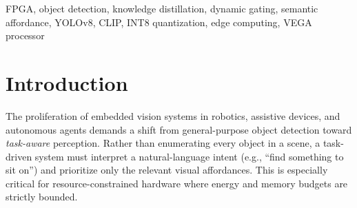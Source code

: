 \documentclass[conference]{IEEEtran}
\begin{document}
\begin{abstract}
Current object detection systems for edge devices are constrained by the computational
burden of cross-modal attention mechanisms, which carry a quadratic complexity of
$O(N^{2})$. These architectures produce large similarity matrices and rely on Softmax
functions that are incompatible with the fixed-point arithmetic of embedded processors
such as the VEGA RISC-V processor, creating critical memory bottlenecks. This paper
proposes a task-driven pipeline that replaces heavy cross-modal attention with a
lightweight dynamic gating mechanism operating at the channel level, reducing fusion
complexity to $O(N)$. A YOLOv8 visual backbone is distilled from a frozen CLIP teacher
model, transferring functional affordance reasoning into a compact 6\,MB student model
via Mean Squared Error minimization. A Task-Mapping Multi-Layer Perceptron (MLP)
generates Hadamard-product gating coefficients that selectively activate or suppress
feature channels based on semantic intent. Deployment on the Genesys-2 FPGA using
INT8 quantization and bit-shift arithmetic yields a 96.29\% average channel sparsity,
a 40.93\% improvement in semantic alignment over the YOLOv8 baseline, and a
77.04\% estimated dynamic power saving---all while maintaining 100\% detection
consistency with the dense baseline across 5,000 test images.
\end{abstract}

\begin{IEEEkeywords}
FPGA, object detection, knowledge distillation, dynamic gating, semantic affordance,
YOLOv8, CLIP, INT8 quantization, edge computing, VEGA processor
\end{IEEEkeywords}

\section{Introduction}

The proliferation of embedded vision systems in robotics, assistive devices, and
autonomous agents demands a shift from general-purpose object detection toward
\emph{task-aware} perception. Rather than enumerating every object in a scene, a
task-driven system must interpret a natural-language intent (e.g., ``find something
to sit on'') and prioritize only the relevant visual affordances. This is especially
critical for resource-constrained hardware where energy and memory budgets are
strictly bounded.
\end{document}
